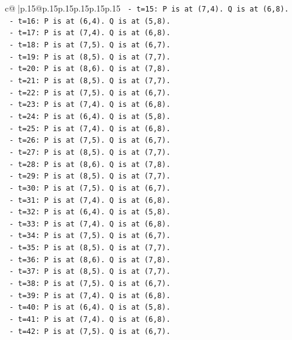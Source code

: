 \documentclass{article}
\begin{document}
{\begin{supertabular}{c@{$\;$}|p{.15\linewidth}@{}p{.15\linewidth}p{.15\linewidth}p{.15\linewidth}p{.15\linewidth}p{.15\linewidth}}
{{{\texttt{    {-} t=15: P is at (7,4). Q is at (6,8).} \\
\texttt{    {-} t=16: P is at (6,4). Q is at (5,8).} \\
\texttt{    {-} t=17: P is at (7,4). Q is at (6,8).} \\
\texttt{    {-} t=18: P is at (7,5). Q is at (6,7).} \\
\texttt{    {-} t=19: P is at (8,5). Q is at (7,7).} \\
\texttt{    {-} t=20: P is at (8,6). Q is at (7,8).} \\
\texttt{    {-} t=21: P is at (8,5). Q is at (7,7).} \\
\texttt{    {-} t=22: P is at (7,5). Q is at (6,7).} \\
\texttt{    {-} t=23: P is at (7,4). Q is at (6,8).} \\
\texttt{    {-} t=24: P is at (6,4). Q is at (5,8).} \\
\texttt{    {-} t=25: P is at (7,4). Q is at (6,8).} \\
\texttt{    {-} t=26: P is at (7,5). Q is at (6,7).} \\
\texttt{    {-} t=27: P is at (8,5). Q is at (7,7).} \\
\texttt{    {-} t=28: P is at (8,6). Q is at (7,8).} \\
\texttt{    {-} t=29: P is at (8,5). Q is at (7,7).} \\
\texttt{    {-} t=30: P is at (7,5). Q is at (6,7).} \\
\texttt{    {-} t=31: P is at (7,4). Q is at (6,8).} \\
\texttt{    {-} t=32: P is at (6,4). Q is at (5,8).} \\
\texttt{    {-} t=33: P is at (7,4). Q is at (6,8).} \\
\texttt{    {-} t=34: P is at (7,5). Q is at (6,7).} \\
\texttt{    {-} t=35: P is at (8,5). Q is at (7,7).} \\
\texttt{    {-} t=36: P is at (8,6). Q is at (7,8).} \\
\texttt{    {-} t=37: P is at (8,5). Q is at (7,7).} \\
\texttt{    {-} t=38: P is at (7,5). Q is at (6,7).} \\
\texttt{    {-} t=39: P is at (7,4). Q is at (6,8).} \\
\texttt{    {-} t=40: P is at (6,4). Q is at (5,8).} \\
\texttt{    {-} t=41: P is at (7,4). Q is at (6,8).} \\
\texttt{    {-} t=42: P is at (7,5). Q is at (6,7).} \\
}}}
\end{supertabular}}
\end{document}
